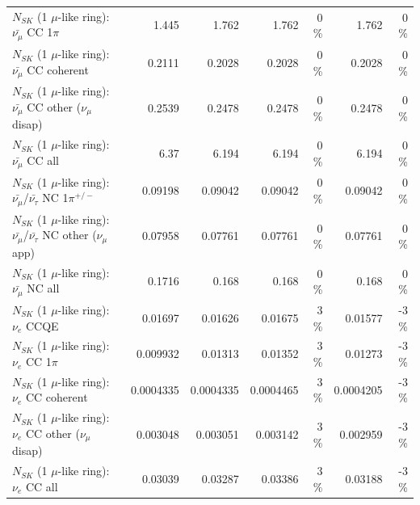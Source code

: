\begin{table}
\begin{tabular}{| l | r | r | r  r | r  r |}
                         $N_{SK}$ (1 $\mu$-like ring): $\bar{\nu_\mu}$ CC 1$\pi$ &           1.445 &           1.762 &           1.762 &        0 \%  &           1.762 &        0 \%  \\ 
                       $N_{SK}$ (1 $\mu$-like ring): $\bar{\nu_\mu}$ CC coherent &          0.2111 &          0.2028 &          0.2028 &        0 \%  &          0.2028 &        0 \%  \\ 
        $N_{SK}$ (1 $\mu$-like ring): $\bar{\nu_\mu}$ CC other ($\nu_\mu$ disap) &          0.2539 &          0.2478 &          0.2478 &        0 \%  &          0.2478 &        0 \%  \\ 
                          $N_{SK}$ (1 $\mu$-like ring): $\bar{\nu_{\mu}}$ CC all &            6.37 &           6.194 &           6.194 &        0 \%  &           6.194 &        0 \%  \\ 
\hline
  $N_{SK}$ (1 $\mu$-like ring): $\bar{\nu_\mu}$/$\bar{\nu_\tau}$ NC 1$\pi^{+/-}$ &         0.09198 &         0.09042 &         0.09042 &        0 \%  &         0.09042 &        0 \%  \\ 
$N_{SK}$ (1 $\mu$-like ring): $\bar{\nu_\mu}$/$\bar{\nu_\tau}$ NC other ($\nu_\mu$ app) &         0.07958 &         0.07761 &         0.07761 &        0 \%  &         0.07761 &        0 \%  \\ 
                          $N_{SK}$ (1 $\mu$-like ring): $\bar{\nu_{\mu}}$ NC all &          0.1716 &           0.168 &           0.168 &        0 \%  &           0.168 &        0 \%  \\ 
\hline
\hline
\hline
                                      $N_{SK}$ (1 $\mu$-like ring): $\nu_e$ CCQE &         0.01697 &         0.01626 &         0.01675 &        3 \%  &         0.01577 &       -3 \%  \\ 
                                 $N_{SK}$ (1 $\mu$-like ring): $\nu_e$ CC 1$\pi$ &        0.009932 &         0.01313 &         0.01352 &        3 \%  &         0.01273 &       -3 \%  \\ 
                               $N_{SK}$ (1 $\mu$-like ring): $\nu_e$ CC coherent &       0.0004335 &       0.0004335 &       0.0004465 &        3 \%  &       0.0004205 &       -3 \%  \\ 
                $N_{SK}$ (1 $\mu$-like ring): $\nu_e$ CC other ($\nu_\mu$ disap) &        0.003048 &        0.003051 &        0.003142 &        3 \%  &        0.002959 &       -3 \%  \\ 
                                  $N_{SK}$ (1 $\mu$-like ring): $\nu_{e}$ CC all &         0.03039 &         0.03287 &         0.03386 &        3 \%  &         0.03188 &       -3 \%  \\ 

\end{tabular}
\end{table}
